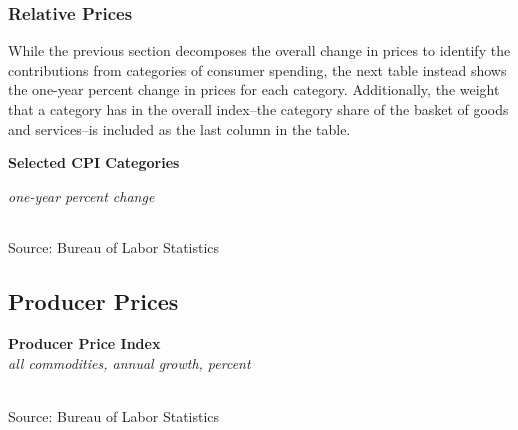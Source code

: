 \documentclass{report}
\makeatletter
\newcommand{\tbllink}[1]{\href{https://raw.githubusercontent.com/bdecon/US-chartbook/master/chartbook/data/#1}{\faTable}}
\newcommand*\short[1]{\expandafter\@gobbletwo\number\numexpr#1\relax}
\newcommand{\dateaxisticks}{
		date coordinates in=x, axis line style={draw=none},
		xmax={2021-06-15},
		max space between ticks=40,	    
		xtick={{1990-01-01}, {1992-01-01}, {1994-01-01}, 
			{1996-01-01}, {1998-01-01}, {2000-01-01}, 
			{2002-01-01}, {2004-01-01}, {2006-01-01},
			{2008-01-01}, {2010-01-01}, {2012-01-01}, {2014-01-01},
		    {2016-01-01}, {2018-01-01}, {2020-01-01}},
		minor xtick={{1989-01-01}, {1991-01-01}, {1993-01-01},
			{1995-01-01}, {1997-01-01}, {1999-01-01}, 
			{2001-01-01}, {2003-01-01}, {2005-01-01}, {2007-01-01},
		    {2009-01-01}, {2011-01-01}, {2013-01-01}, {2015-01-01},
		    {2017-01-01}, {2019-01-01}, {2021-01-01}},
		enlarge y limits={0.06}, enlarge x limits={0.01},
		}
\newcommand{\bbar}[2]{extra #1 ticks = {{#2}}, extra #1 tick labels = ,
		extra #1 tick style = {grid=major, grid style={thick, black!25}},}
\newcommand{\stdline}[4]{\addplot[very thick, no markers, color=#1] 
		table [x=#2, y=#3, col sep=comma] {#4};	}
\newcommand{\rbars}{
		\fill[color=black!10] (axis cs:{1990-07-01},\pgfkeysvalueof{/pgfplots/ymin}) rectangle 
			(axis cs:{1991-03-01}, \pgfkeysvalueof{/pgfplots/ymax});
		\fill[color=black!10] (axis cs:{2007-12-01},\pgfkeysvalueof{/pgfplots/ymin}) rectangle 
			(axis cs:{2009-07-01}, \pgfkeysvalueof{/pgfplots/ymax});
		\fill[color=black!10] (axis cs:{2001-03-01},\pgfkeysvalueof{/pgfplots/ymin}) rectangle 
			(axis cs:{2001-11-01}, \pgfkeysvalueof{/pgfplots/ymax});
		\fill[color=black!10] (axis cs:{2020-02-01},\pgfkeysvalueof{/pgfplots/ymin}) rectangle 
			(axis cs:{2021-06-15}, \pgfkeysvalueof{/pgfplots/ymax});}
\makeatother
\begin{document}
{{\begin{minipage}{0.76\textwidth}
\subsubsection*{\color{black!70} \seriffont Relative Prices}
\small While the previous section decomposes the overall change in prices to identify the contributions from categories of consumer spending, the next table instead shows the one-year percent change in prices for each category. Additionally, the weight that a category has in the overall index--the category share of the basket of goods and services--is included as the last column in the table.
\vspace{1.5mm}

\normalsize \textbf{Selected CPI Categories}\\
\footnotesize{\textit{one-year percent change}\\
\hspace*{-3mm}  \setlength{\tabcolsep}{3.1pt} \color{black!90}
		{\renewcommand{\arraystretch}{1.54}
\begin{tabular}{p{41mm} R{7.0mm} R{7.0mm} R{7.0mm} R{7.0mm}
		 		 R{7.0mm} R{7.0mm} R{7.0mm} R{10mm}} %
			  \hline
		\end{tabular}}}
\vspace{-2mm}		
		
\footnotesize{Source: Bureau of Labor Statistics}
\vspace{3.5mm}

\small 
\end{minipage}
\newpage
\subsection*{\color{black!70} \seriffont Producer Prices}
\vspace{1mm}

\begin{minipage}{0.47\textwidth}
\normalsize \textbf{Producer Price Index}\\
\footnotesize{\textit{all commodities, annual growth, percent}}\\
\hspace*{-2mm} \\
\footnotesize{Source: Bureau of Labor Statistics} \hfill \tbllink{ppi.csv}
\end{minipage} \hspace{6mm} 
\begin{minipage}{0.24\textwidth}
\small 
\end{minipage}
\newpage
}}
\end{document}
